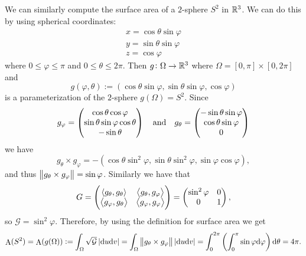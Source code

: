 \documentclass[11pt,a4paper]{article}
\DeclareMathOperator{\A}{A} %
\begin{document}
\begin{example}
  We can similarly compute the surface area of a $2$-sphere $S^2$ in $\mathbb{R}^3$.
  We can do this by using spherical coordinates:
  \begin{gather*}
    x = \cos \theta \sin \varphi \\
    y = \sin \theta \sin \varphi \\
    z = \cos \varphi
  \end{gather*}
  where $0 \le \varphi \le \pi$ and $0 \le \theta \le 2\pi$.
  Then $g \colon \Omega \to \mathbb{R}^3$ where $\Omega = [0,\pi] \times [0,2\pi]$
  and
  \[
    g(\varphi,\theta) :=
      (\cos \theta \sin \varphi, \sin \theta \sin \varphi, \cos \varphi)
  \]
  is a parameterization of the $2$-sphere $g(\Omega) = S^2$.
  Since
  \[
    g_{\varphi} =
    \begin{pmatrix}
      \cos \theta \cos \varphi \\
      \sin \theta \sin \varphi \cos \theta \\
      -\sin \theta
    \end{pmatrix} \quad \text{and} \quad
    g_{\theta} =
    \begin{pmatrix}
      -\sin \theta \sin \varphi \\
      \cos \theta \sin \varphi \\
      0
    \end{pmatrix}
  \]
  we have
  \[
    g_{\theta} \times g_{\varphi} =
    -(\cos \theta \sin^2 \varphi,
      \sin \theta \sin^2 \varphi,
      \sin \varphi \cos \varphi),
  \]
  and thus $\left\lVert g_{\theta} \times g_{\varphi}\right\rVert = \sin \varphi$.
  Similarly we have that
  \[
    G =
    \begin{pmatrix}
      \left\langle g_{\theta}, g_{\theta} \right\rangle & \left\langle g_{\theta}, g_{\varphi} \right\rangle \\
      \left\langle g_{\varphi}, g_{\theta} \right\rangle & \left\langle g_{\varphi}, g_{\varphi} \right\rangle
    \end{pmatrix} =
    \begin{pmatrix}
      \sin^2 \varphi & 0 \\
      0 & 1
    \end{pmatrix}, 
  \]
  so $\mathcal G = \sin^2 \varphi$.
  Therefore, by using the definition for surface area we get
  \[
    \A(S^2) =
    \A(g(\Omega)) :=
    \int_{\Omega} \sqrt{\mathcal G} \abs{\du \dv} =
    \int_{\Omega} \norm{g_{\theta} \times g_{\varphi}} \abs{\du \dv} =
    \int_{0}^{2\pi}
      \del{\int_{0}^{\pi} \sin \varphi \dif \varphi} \dtheta = 4 \pi.
  \]
\end{example}
\end{document}
